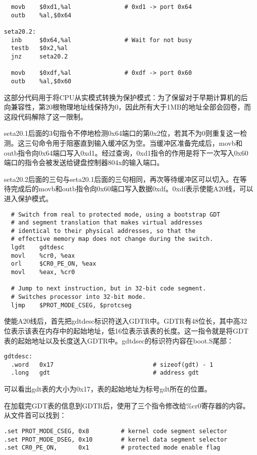\begin{exerciseSolution}{3}
\begin{lstlisting}
  movb    $0xd1,%al               # 0xd1 -> port 0x64
  outb    %al,$0x64

seta20.2:
  inb     $0x64,%al               # Wait for not busy
  testb   $0x2,%al
  jnz     seta20.2

  movb    $0xdf,%al               # 0xdf -> port 0x60
  outb    %al,$0x60
\end{lstlisting}
\par 这部分代码用于将CPU从实模式转换为保护模式：为了保留对于早期计算机的后向兼容性，第20根物理地址线保持为0，因此所有大于1MB的地址全部会回卷，而这段代码解除了这一限制。
\par seta20.1后面的3句指令不停地检测0x64端口的第0x2位，若其不为0则重复这一检测。这三句命令用于阻塞直到输入缓冲区为空。当缓冲区准备完成后，movb和outb指令向0x64端口写入0xd1。经过查询，0xd1指令的作用是将下一次写入0x60端口的指令会被发送给键盘控制器804x的输入端口。
\par seta20.2后面的三句与seta20.1后面的三句相同，再次等待缓冲区可以切入。在等待完成后的movb和outb指令向0x60端口写入数据0xdf。0xdf表示使能A20线，可以进入保护模式。

\begin{lstlisting}
  # Switch from real to protected mode, using a bootstrap GDT
  # and segment translation that makes virtual addresses
  # identical to their physical addresses, so that the
  # effective memory map does not change during the switch.
  lgdt    gdtdesc
  movl    %cr0, %eax
  orl     $CR0_PE_ON, %eax
  movl    %eax, %cr0

  # Jump to next instruction, but in 32-bit code segment.
  # Switches processor into 32-bit mode.
  ljmp    $PROT_MODE_CSEG, $protcseg
\end{lstlisting}

\par 使能A20线后，首先把gdtdesc标识符送入GDTR中。GDTR有48位长，其中高32位表示该表在内存中的起始地址，低16位表示该表的长度。这一指令就是将GDT表的起始地址以及长度送入GDTR中。gdtdsec的标识符内容在boot.S尾部：
\begin{lstlisting}
gdtdesc:
  .word   0x17                            # sizeof(gdt) - 1
  .long   gdt                             # address gdt
\end{lstlisting}
\par 可以看出gdt表的大小为0x17，表的起始地址为标号gdt所在的位置。
\par 在加载完GDT表的信息到GDTR后，使用了三个指令修改给\%cr0寄存器的内容。从文件首可以找到：
\begin{lstlisting}
.set PROT_MODE_CSEG, 0x8         # kernel code segment selector
.set PROT_MODE_DSEG, 0x10        # kernel data segment selector
.set CR0_PE_ON,      0x1         # protected mode enable flag
\end{lstlisting}


\end{exerciseSolution}
